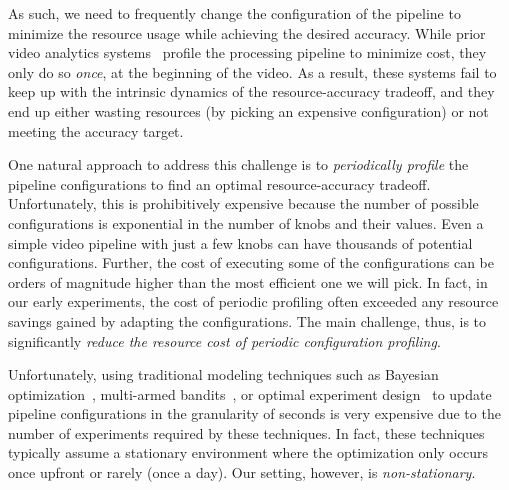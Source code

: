 As such, we need to frequently change the configuration of the pipeline to minimize the resource usage while achieving the desired accuracy. While prior video analytics systems~\cite{videostar,noscope,zhang2015design,mcdnn} profile the processing pipeline to minimize cost, they only do so \emph{once}, at the beginning of the video. As a result, these systems fail to keep up with the intrinsic dynamics of the resource-accuracy tradeoff, and they end up either wasting resources (by picking an expensive configuration) or not meeting the accuracy target.

One natural approach to address this challenge is to {\em periodically profile} the pipeline configurations to find an optimal resource-accuracy tradeoff. Unfortunately, this is prohibitively expensive because the number of possible configurations is exponential in the number of knobs and their values. Even a simple video pipeline with just a few knobs can have thousands of potential configurations. Further, the cost of executing some of the configurations can be orders of magnitude higher than the most efficient one we will pick. In fact, in our early experiments, the cost of periodic profiling often exceeded any resource savings gained by adapting the configurations. The main challenge, thus, is to significantly {\em reduce the resource cost of periodic configuration profiling}.




Unfortunately, using traditional modeling techniques such as Bayesian optimization~\cite{cherrypick}, multi-armed bandits~\cite{amazon-bandit}, or optimal experiment design~\cite{ernest} to update pipeline configurations in the granularity of seconds is very expensive due to the number of experiments required by these techniques. In fact, these techniques typically assume a stationary environment where the optimization only occurs once upfront or rarely (once a day). Our setting, however, is {\em non-stationary}. 

